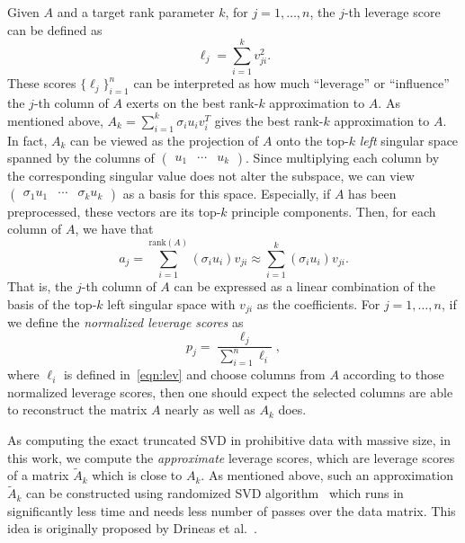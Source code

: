 Given $A$ and a target rank parameter $k$, for $j=1,\ldots,n$, the $j$-th leverage score can be defined as
\begin{equation}
 \label{eqn:lev}
  \ell_j = \sum_{i=1}^k v_{ji}^2.
\end{equation}
These scores $\{\ell_j\}_{i=1}^{n}$ can be interpreted as how much ``leverage'' or ``influence'' the $j$-th column of $A$ exerts on the best rank-$k$ approximation to $A$. 
As mentioned above, $A_k = \sum_{i=1}^k \sigma_i u_i v_i^T$ gives the best rank-$k$ approximation to $A$.
In fact, $A_k$ can be viewed as the projection of $A$ onto the top-$k$ \emph{left} singular space spanned by the columns of $\begin{pmatrix} u_1 & \cdots & u_k \end{pmatrix}$.
Since multiplying each column by the corresponding singular value does not alter the subspace, we can view
$\begin{pmatrix} \sigma_1 u_1 & \cdots & \sigma_k u_k \end{pmatrix}$ as a basis for this space.  
Especially, if $A$ has been preprocessed, these vectors are its top-$k$ principle components.
Then, for each column of $A$, we have that
  $$  a_j = \sum_{i=1}^{\text{rank}(A)} (\sigma_i u_i) v_{ji} \approx \sum_{i=1}^k (\sigma_i u_i) v_{ji}.  $$
That is, the $j$-th column of $A$ can be expressed as a linear combination of the basis of the top-$k$ left singular space with $v_{ji}$ as the coefficients.
For $j=1,\ldots,n$, if we define the {\it normalized leverage scores} as
\begin{equation}
\label{eqn:nlev}
  p_j = \frac{\ell_j}{\sum_{i=1}^n \ell_i},
\end{equation}      
where $\ell_i$ is defined in~\eqref{eqn:lev} and choose columns from $A$ according to those normalized leverage scores, then one should expect
the selected columns are able to reconstruct the matrix $A$ nearly as well as $A_k$ does.

As computing the exact truncated SVD in prohibitive data with massive size, 
in this work, we compute the {\it approximate} leverage scores, which are leverage scores of a matrix $\tilde A_k$ which is close to $A_k$. As mentioned above, such an approximation $\tilde A_k$ can be constructed using randomized SVD algorithm~\cite{HMT11} which runs in significantly less time and needs less number of passes over the data matrix. This idea is originally proposed by Drineas et al.~\cite{DMMW12_JMLR}. 

